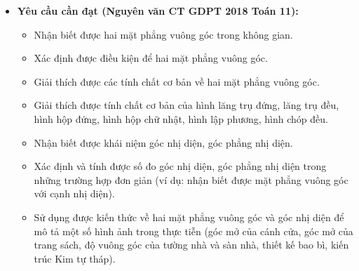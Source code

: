 \documentclass[12pt, a4paper]{article}
\begin{document}
\begin{itemize}[leftmargin=1.2cm]
    \item \textbf{Yêu cầu cần đạt (Nguyên văn CT GDPT 2018 Toán 11):}
    \begin{itemize}[leftmargin=0.6cm]
        \item Nhận biết được hai mặt phẳng vuông góc trong không gian.
        \item Xác định được điều kiện để hai mặt phẳng vuông góc.
        \item Giải thích được các tính chất cơ bản về hai mặt phẳng vuông góc.
        \item Giải thích được tính chất cơ bản của hình lăng trụ đứng, lăng trụ đều, hình hộp đứng, hình hộp chữ nhật, hình lập phương, hình chóp đều.
        \item Nhận biết được khái niệm góc nhị diện, góc phẳng nhị diện.
        \item Xác định và tính được số đo góc nhị diện, góc phẳng nhị diện trong những trường hợp đơn giản (ví dụ: nhận biết được mặt phẳng vuông góc với cạnh nhị diện).
        \item Sử dụng được kiến thức về hai mặt phẳng vuông góc và góc nhị diện để mô tả một số hình ảnh trong thực tiễn (góc mở của cánh cửa, góc mở của trang sách, độ vuông góc của tường nhà và sàn nhà, thiết kế bao bì, kiến trúc Kim tự tháp).
    \end{itemize}


\end{itemize}
\end{document}
